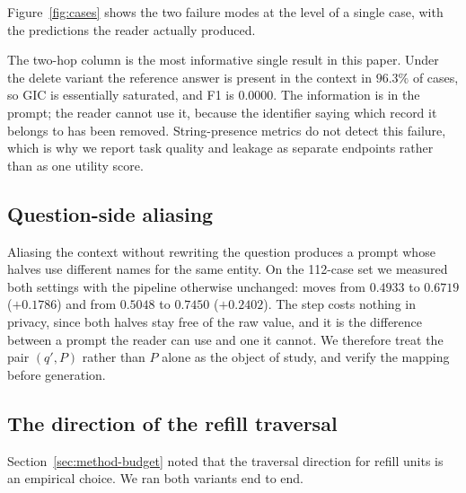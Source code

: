 

Figure~\ref{fig:cases} shows the two failure modes at the level of a single case, with the
predictions the reader actually produced.

The two-hop column is the most informative single result in this paper. Under the delete
variant the reference answer is present in the context in $96.3\%$ of cases, so GIC is
essentially saturated, and F1 is $0.0000$. The information is in the prompt; the reader
cannot use it, because the identifier saying which record it belongs to has been removed.
String-presence metrics do not detect this failure, which is why we report task quality and
leakage as separate endpoints rather than as one utility score.

\subsection{Question-side aliasing}

Aliasing the context without rewriting the question produces a prompt whose halves use
different names for the same entity. On the 112-case set we measured both settings with the
pipeline otherwise unchanged:  moves from $0.4933$ to $0.6719$ ($+0.1786$) and
 from $0.5048$ to $0.7450$ ($+0.2402$). The step costs nothing in
privacy, since both halves stay free of the raw value, and it is the difference between a
prompt the reader can use and one it cannot. We therefore treat the pair $(q',P)$ rather
than $P$ alone as the object of study, and verify the mapping before generation.

\subsection{The direction of the refill traversal}

Section~\ref{sec:method-budget} noted that the traversal direction for refill units is an
empirical choice. We ran both variants end to end.

\begin{center}\small
\setlength{\tabcolsep}{4pt}
\end{center}

